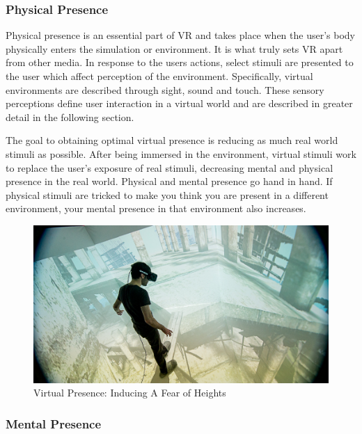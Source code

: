 \documentclass[12pt]{article}
\begin{document}
\subsubsection{Physical Presence}

Physical presence is an essential part of VR and takes place when the user's body physically enters the simulation or environment. It is what truly sets VR apart from other media.  In response to the users actions, select stimuli are presented to the user which affect perception of the environment. Specifically, virtual environments are described through sight, sound and touch. These sensory perceptions define user interaction in a virtual world and are described in greater detail in the following section. 
 
 \par The goal to obtaining optimal virtual presence is reducing as much real world stimuli as possible.
 After being immersed in the environment, virtual stimuli work to replace the user's exposure of real stimuli, decreasing mental and physical presence in the real world. Physical and mental presence go hand in hand. If physical stimuli are tricked to make you think you are present in a different environment, your mental presence in that environment also increases. 
 
 
 \begin{figure}[h]
    \centering
 \includegraphics[width=.7\textwidth]{photo15_presence}
  \caption{Virtual Presence: Inducing A Fear of Heights \cite{CAVE}}
  \label{fig:virtualPresence}
 \end{figure}
 
 \subsubsection{Mental Presence}
 
\end{document}

